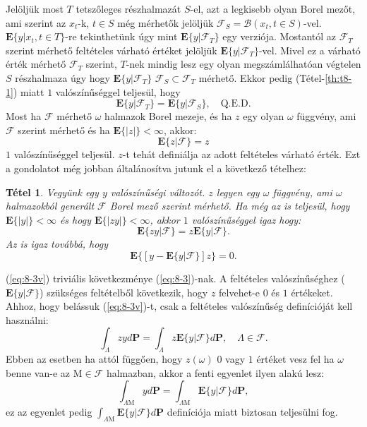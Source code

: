\documentclass{article}
\newtheorem{theorem}{Tétel}
\begin{document}
Jelöljük most $T$ tetszőleges részhalmazát $S$-el, azt a legkisebb olyan Borel mezőt, ami szerint az $x_t$-k, $t \in S$ még mérhetők jelöljük $\mathscr{F}_S = \mathscr{B}(x_t, t \in S)$-vel. $\mathrm{\textbf{E}}\{y | x_t, t \in T \}$-re tekinthetünk úgy mint $\mathrm{\textbf{E}}\{y | \mathscr{F}_T \}$ egy verziója. Mostantól az $\mathscr{F}_T$ szerint mérhető feltételes várható értéket jelöljük $\mathrm{\textbf{E}}\{y | \mathscr{F}_T \}$-vel. Mivel ez a várható érték mérhető $\mathscr{F}_T$ szerint, $T$-nek mindig lesz egy olyan megszámlálhatóan végtelen $S$ részhalmaza úgy hogy $\mathrm{\textbf{E}}\{y | \mathscr{F}_T \}$ $\mathscr{F}_S \subset \mathscr{F}_T$ mérhető. Ekkor pedig (Tétel-\ref{th:t8-1}) miatt $1$ valószínűséggel teljesül, hogy 
\[
 \mathrm{\textbf{E}}\{y | \mathscr{F}_T \} = \mathrm{\textbf{E}}\{y | \mathscr{F}_S \}, \quad \mathrm{Q.E.D.}
\]
Most ha $\mathscr{F}$ mérhető $\omega$ halmazok Borel mezeje, és ha $z$ egy olyan $\omega$ függvény, ami $\mathscr{F}$ szerint mérhető és ha $\mathrm{\textbf{E}}\{|z|\} < \infty$, akkor:
\[
	\mathrm{\textbf{E}}\{z | \mathscr{F} \} = z
\]
$1$ valószínűséggel teljesül. $z$-t tehát definiálja az adott feltételes várható érték. Ezt a gondolatot még jobban általánosítva jutunk el a következő tételhez:
\begin{theorem}
	Vegyünk egy $y$ valószínűségi változót. $z$ legyen egy $\omega$ függvény, ami $\omega$ halmazokból generált $\mathscr{F}$ Borel mező szerint mérhető. Ha még az is teljesül, hogy $\mathrm{\textbf{E}}\{|y|\} < \infty$ és hogy $\mathrm{\textbf{E}}\{|zy|\} < \infty$, akkor $1$ valószínűséggel igaz hogy:
	\begin{equation}
		\mathrm{\textbf{E}}\{zy | \mathscr{F} \} = z \mathrm{\textbf{E}}\{y | \mathscr{F} \}.
		\label{eq:8-3}
	\end{equation}
	Az is igaz továbbá, hogy
	\begin{equation}
		\mathrm{\textbf{E}}\{[y - \mathrm{\textbf{E}}\{y | \mathscr{F} \} ]z \} = 0.
		\label{eq:8-3v}
	\end{equation}
\end{theorem}
(\ref{eq:8-3v}) triviális következménye (\ref{eq:8-3})-nak. A feltételes valószínűséghez ($\mathrm{\textbf{E}}\{y | \mathscr{F} \}$) szükséges feltételből következik, hogy $z$ felvehet-e $0$ és $1$ értékeket. Ahhoz, hogy belássuk (\ref{eq:8-3v})-t, csak a feltételes valószínűség definícióját kell használni: 
\begin{equation}
 \int_{\Lambda} zy d\mathrm{\textbf{P}} = \int_{\Lambda} z \mathrm{\textbf{E}}\{y | \mathscr{F} \} d\mathrm{\textbf{P}}, \quad \Lambda \in \mathscr{F}.
\end{equation}
Ebben az esetben ha attól függően, hogy $z(\omega)$ $0$ vagy $1$ értéket vesz fel ha $\omega$ benne van-e az $\mathrm{M} \in \mathscr{F}$ halmazban, akkor a fenti egyenlet ilyen alakú lesz:
\begin{equation}
 \int_{\Lambda \mathrm{M} } y d\mathrm{\textbf{P}} = \int_{\Lambda \mathrm{M}} \mathrm{\textbf{E}}\{y | \mathscr{F} \} d\mathrm{\textbf{P}},
\end{equation}
ez az egyenlet pedig $\int_{\Lambda \mathrm{M}} \mathrm{\textbf{E}}\{y | \mathscr{F} \} d\mathrm{\textbf{P}}$ definíciója miatt biztosan teljesülni fog.
\end{document}
